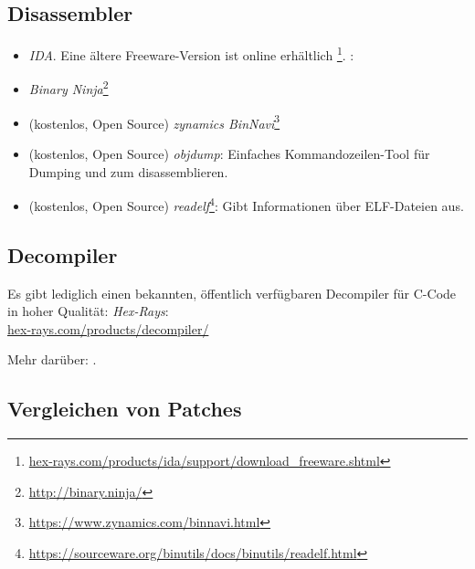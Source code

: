 \subsection{Disassembler}


\begin{itemize}
\item \emph{IDA}. Eine ältere Freeware-Version ist online erhältlich
\footnote{\href{http://www.hex-rays.com/idapro/idadownfreeware.htm}{hex-rays.com/products/ida/support/download\_freeware.shtml}}.
\ShortHotKeyCheatsheet: 


\item \emph{Binary Ninja}\footnote{\url{http://binary.ninja/}}

\item (kostenlos, Open Source) \emph{zynamics BinNavi}\footnote{\url{https://www.zynamics.com/binnavi.html}}

\item (kostenlos, Open Source) \emph{objdump}: Einfaches Kommandozeilen-Tool für Dumping und zum disassemblieren.

\item (kostenlos, Open Source) \emph{readelf}\footnote{\url{https://sourceware.org/binutils/docs/binutils/readelf.html}}:
Gibt Informationen über ELF-Dateien aus.
\end{itemize}

\subsection{Decompiler}

Es gibt lediglich einen bekannten, öffentlich verfügbaren Decompiler für C-Code in
hoher Qualität: \emph{Hex-Rays}:\\
\href{https://www.hex-rays.com/products/decompiler/}{hex-rays.com/products/decompiler/}

Mehr darüber: .

\subsection{Vergleichen von Patches}

